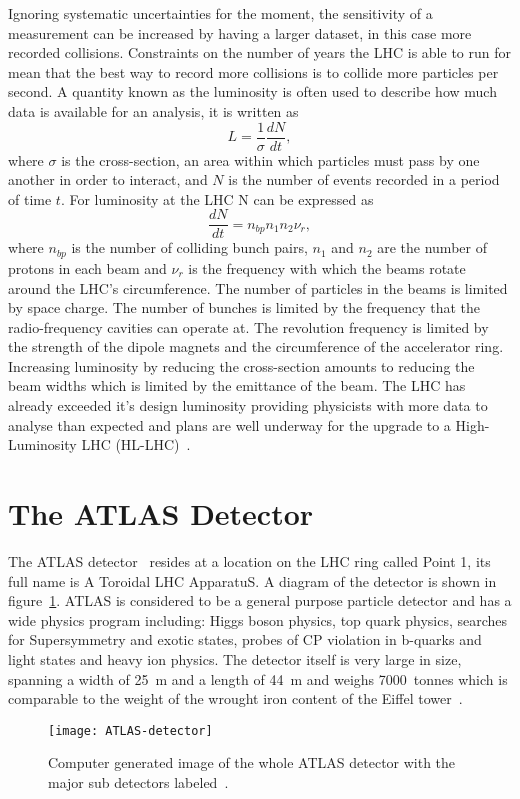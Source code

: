 Ignoring systematic uncertainties for the moment, the sensitivity of a
measurement can be increased by having a larger dataset, in this case more
recorded collisions. Constraints on the number of years the LHC is able to run
for mean that the best way to record more collisions is to collide more
particles per second. A quantity known as the luminosity is often used to
describe how much data is available for an analysis, it is written as
\begin{equation}
  \label{eq:luminosity} L = \frac{1}{\sigma}\frac{dN}{dt},
\end{equation} where $\sigma$ is the cross-section, an area within which
particles must pass by one another in order to interact, and $N$ is the number
of events recorded in a period of time $t$. For luminosity at the LHC N can be
expressed as
\begin{equation}
  \label{eq:lhc-lumi} \frac{dN}{dt} = n_{bp}n_{1}n_{2}\nu_{r},
\end{equation} where $n_{bp}$ is the number of colliding bunch pairs, $n_{1}$
and $n_{2}$ are the number of protons in each beam and $\nu_r$ is the frequency
with which the beams rotate around the LHC's circumference. The number of
particles in the beams is limited by space charge. The number of bunches is
limited by the frequency that the radio-frequency cavities can operate at. The
revolution frequency is limited by the strength of the dipole magnets and the
circumference of the accelerator ring. Increasing luminosity by reducing the
cross-section amounts to reducing the beam widths which is limited by the
emittance of the beam. The LHC has already exceeded it's design luminosity
providing physicists with more data to analyse than expected and plans are well
underway for the upgrade to a High-Luminosity LHC (HL-LHC)~\cite{hilumi-tdr}.

\section{The ATLAS Detector}%
\label{sec:atlas}

The ATLAS detector~\cite{ATLAS} resides at a location on the LHC ring called
Point 1, its full name is A Toroidal LHC ApparatuS. A diagram of the detector is
shown in figure~\ref{fig:ATLAS-det}. ATLAS is considered to be a general purpose
particle detector and has a wide physics program including: Higgs boson physics,
top quark physics, searches for Supersymmetry and exotic states, probes of CP
violation in b-quarks and light states and heavy ion physics. The detector
itself is very large in size, spanning a width of 25~m and a length of 44~m and
weighs 7000~tonnes which is comparable to the weight of the wrought iron content
of the Eiffel tower~\cite{Eiffel-weight}.
\begin{figure}[ht]
  \centering
  \texttt{[image: ATLAS-detector]}
  \caption[The ATLAS Detector]{Computer generated image of the whole ATLAS
    detector with the major sub detectors labeled~\cite{ATLAS-det-fig}.}%
  \label{fig:ATLAS-det}
\end{figure}


